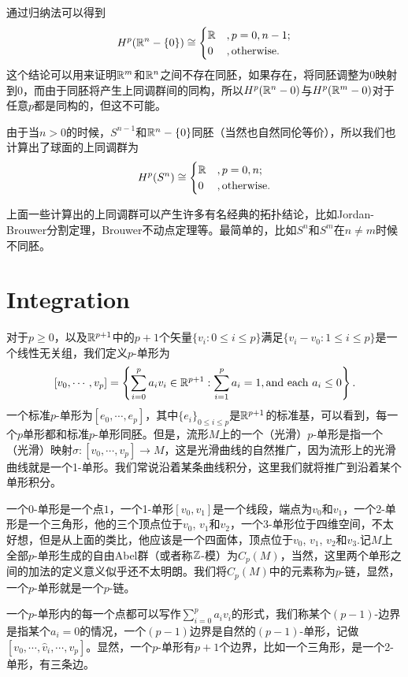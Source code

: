 通过归纳法可以得到
\[H^{p}(\mathbb{R}^n-\{0\})\cong
\begin{cases}
\mathbb{R}&,p=0,n-1;\\
0&,\text{otherwise}.
\end{cases}\]
这个结论可以用来证明$\mathbb{R}^m$和$\mathbb{R}^n$之间不存在同胚，如果存在，将同胚调整为$0$映射到$0$，而由于同胚将产生上同调群间的同构，所以$H^{p}(\mathbb{R}^n-{0})$与$H^{p}(\mathbb{R}^m-{0})$对于任意$p$都是同构的，但这不可能。

由于当$n>0$的时候，$S^{n-1}$和$\mathbb{R}^n-\{0\}$同胚（当然也自然同伦等价），所以我们也计算出了球面的上同调群为
\[H^{p}(S^{n})\cong
\begin{cases}
\mathbb{R}&,p=0,n;\\
0&,\text{otherwise}.
\end{cases}\]

上面一些计算出的上同调群可以产生许多有名经典的拓扑结论，比如Jordan-Brouwer分割定理，Brouwer不动点定理等。最简单的，比如$S^n$和$S^m$在$n\neq m$时候不同胚。

\section{Integration}

\para 对于$p\geq 0$，以及$\mathbb{R}^{p+1}$中的$p+1$个矢量$\{v_i:0\leq i\leq p\}$满足$\{v_i-v_0:1\leq i\leq p\}$是一个线性无关组，我们定义$p$-单形为
\[
	[v_0,\cdots,v_p]=\left\{\sum_{i=0}^p a_iv_i\in \mathbb{R}^{p+1}:\sum_{i=1}^p a_i=1,\text{and each } a_i\leq 0\right\}.
\]
一个标准$p$-单形为$[e_0,\cdots,e_p]$，其中$\{e_i\}_{0\leq i \leq p}$是$\mathbb{R}^{p+1}$的标准基，可以看到，每一个$p$单形都和标准$p$-单形同胚。但是，流形$M$上的一个（光滑）$p$-单形是指一个（光滑）映射$\sigma:[v_0,\cdots,v_p]\to M$，这是光滑曲线的自然推广，因为流形上的光滑曲线就是一个1-单形。我们常说沿着某条曲线积分，这里我们就将推广到沿着某个单形积分。

一个0-单形是一个点$1$，一个1-单形$[v_0,v_1]$是一个线段，端点为$v_0$和$v_1$，一个2-单形是一个三角形，他的三个顶点位于$v_0$, $v_1$和$v_2$，一个3-单形位于四维空间，不太好想，但是从上面的类比，他应该是一个四面体，顶点位于$v_0$, $v_1$, $v_2$和$v_3$.记$M$上全部$p$-单形生成的自由Abel群（或者称$\mathbb{Z}$-模）为$C_p(M)$，当然，这里两个单形之间的加法的定义意义似乎还不太明朗。我们将$C_p(M)$中的元素称为$p$-链，显然，一个$p$-单形就是一个$p$-链。

\para 一个$p$-单形内的每一个点都可以写作$\sum_{i=0}^p a_iv_i$的形式，我们称某个$(p-1)$-边界是指某个$a_i=0$的情况，一个$(p-1)$边界是自然的$(p-1)$-单形，记做$[v_0,\cdots,\hat{v}_i,\cdots,v_p]$。显然，一个$p$-单形有$p+1$个边界，比如一个三角形，是一个2-单形，有三条边。

